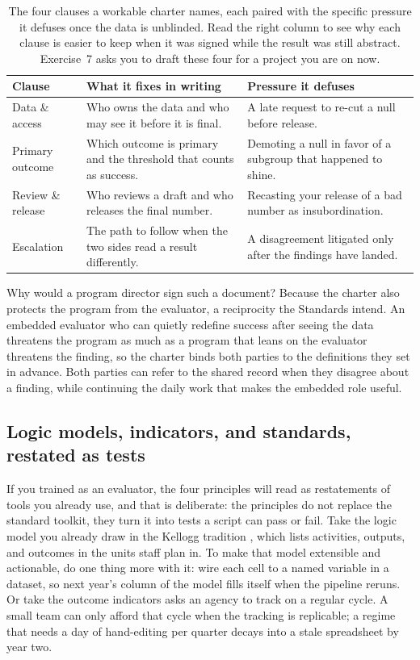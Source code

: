 \documentclass[
    a4paper,
    fontsize=10pt,
    twoside=true,
    numbers=noenddot,
]{kaobook}
\begin{document}
\begin{table}[htbp]
\centering
\footnotesize
\caption[The one-page charter's four clauses]{The four clauses a workable charter names, each paired with the specific pressure it defuses once the data is unblinded. Read the right column to see why each clause is easier to keep when it was signed while the result was still abstract. Exercise~7 asks you to draft these four for a project you are on now.}
\label{tab:ch01-viz-charter}
\footnotesize
\begin{tabular}{@{}p{2.0cm}p{3.6cm}p{3.5cm}@{}}
\hline
\textbf{Clause} & \textbf{What it fixes in writing} & \textbf{Pressure it defuses} \\
\hline
Data \& access & Who owns the data and who may see it before it is final. & A late request to re-cut a null before release. \\
Primary outcome & Which outcome is primary and the threshold that counts as success. & Demoting a null in favor of a subgroup that happened to shine. \\
Review \& release & Who reviews a draft and who releases the final number. & Recasting your release of a bad number as insubordination. \\
Escalation & The path to follow when the two sides read a result differently. & A disagreement litigated only after the findings have landed. \\
\hline
\end{tabular}
\end{table}

Why would a program director sign such a document? Because the charter also protects the program from the evaluator, a reciprocity the Standards intend. An embedded evaluator who can quietly redefine success after seeing the data threatens the program as much as a program that leans on the evaluator threatens the finding, so the charter binds both parties to the definitions they set in advance. Both parties can refer to the shared record when they disagree about a finding, while continuing the daily work that makes the embedded role useful.

\subsection{Logic models, indicators, and standards, restated as tests}
If you trained as an evaluator, the four principles will read as restatements of tools you already use, and that is deliberate: the principles do not replace the standard toolkit, they turn it into tests a script can pass or fail. Take the logic model you already draw in the Kellogg tradition \parencite{kellogg2004logic}, which lists activities, outputs, and outcomes in the units staff plan in. To make that model extensible and actionable, do one thing more with it: wire each cell to a named variable in a dataset, so next year's column of the model fills itself when the pipeline reruns. Or take the outcome indicators \textcite{hatry2006performance} asks an agency to track on a regular cycle. A small team can only afford that cycle when the tracking is replicable; a regime that needs a day of hand-editing per quarter decays into a stale spreadsheet by year two.
\end{document}
